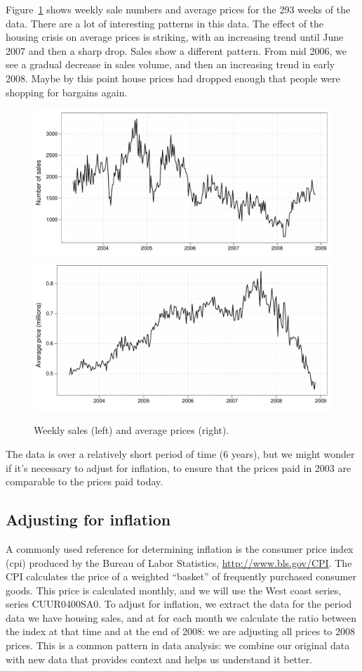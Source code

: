 \documentclass[oneside]{article}
\begin{document}
Figure~\ref{fig:daily} shows weekly sale numbers and average prices for the 293 weeks of the data.  There are a lot of interesting patterns in this data.  The effect of the housing crisis on average prices is striking, with an increasing trend until June 2007 and then a sharp drop.  Sales show a different pattern.  From mid 2006, we see a gradual decrease in sales volume, and then an increasing trend in early 2008.  Maybe by this point house prices had dropped enough that people were shopping for bargains again.

\begin{figure}[htbp]
  \centering
    \includegraphics[width=0.5 \linewidth]{daily-sales}%
    \includegraphics[width=0.5 \linewidth]{daily-price}%
  \caption{Weekly sales (left) and average prices (right).}
  \label{fig:daily}
\end{figure}

The data is over a relatively short period of time (6 years), but we might wonder if it's necessary to adjust for inflation, to ensure that the prices paid in 2003 are comparable to the prices paid today.

\subsection{Adjusting for inflation}

A commonly used reference for determining inflation is the consumer price index ({\sc cpi}) produced by the Bureau of Labor Statistics, \url{http://www.bls.gov/CPI}.  The {\sc CPI} calculates the price of a weighted ``basket'' of frequently purchased consumer goods.  This price is calculated monthly, and we will use the West coast series, series CUUR0400SA0.
To adjust for inflation, we extract the data for the period data we have housing sales, and at for each month we calculate the ratio between the index at that time and at the end of 2008: we are adjusting all prices to 2008 prices. This is a common pattern in data analysis: we combine our original data with new data that provides context and helps us understand it better.  
\end{document}
